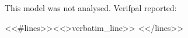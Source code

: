 \noindent This model was not analysed. Verifpal reported:

\medskip
\noindent\colorbox{vptint}{\parbox{\dimexpr\linewidth-2\fboxsep\relax}{\vpverbatim\small\color{vpaccent}<<#lines>><<>verbatim_line>>
<</lines>>}}
